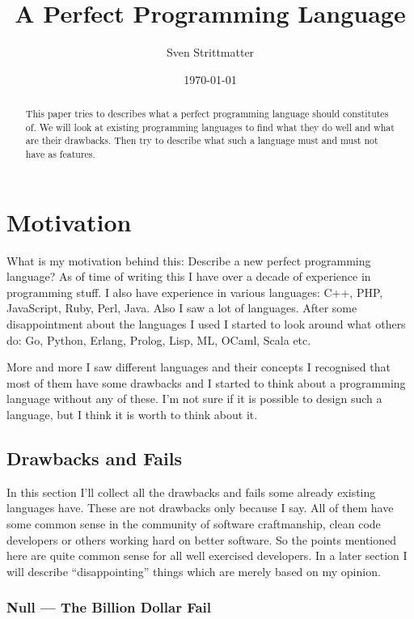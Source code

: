 \documentclass[11pt, a4paper]{report}
\title{A Perfect Programming Language}
\author{Sven Strittmatter}
\date{\today}
\begin{document}
\maketitle
\thispagestyle{empty}

\begin{abstract}
This paper tries to describes what a perfect programming language should constitutes of. We will look at existing programming languages to find what they do well and what are their drawbacks. Then try to describe what such a language must and must not have as features.
\end{abstract}

\tableofcontents

\chapter{Motivation}

What is my motivation behind this: Describe a new perfect programming language? As of time of writing this I have over a decade of experience in programming stuff. I also have experience in various languages: C++, PHP, JavaScript, Ruby, Perl, Java. Also I saw a lot of languages. After some disappointment about the languages I used I started to look around what others do: Go, Python, Erlang, Prolog, Lisp, ML, OCaml, Scala etc.

More and more I saw different languages and their concepts I recognised that most of them have some drawbacks and I started to think about a programming language without any of these. I'm not sure if it is possible to design such a language, but I think it is worth to think about it.

\section{Drawbacks and Fails}

In this section I'll collect all the drawbacks and fails some already existing languages have. These are not drawbacks only because I say. All of them have some common sense in the community of software craftmanship, clean code developers or others working hard on better software. So the points mentioned here are quite common sense for all well exercised developers. In a later section I will describe ``disappointing'' things which are merely based on my opinion.

\subsection{Null --- The Billion Dollar Fail}
\end{document}
